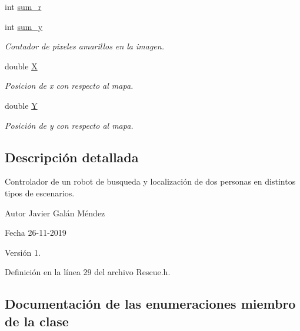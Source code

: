 \begin{DoxyCompactItemize}
int \hyperlink{classRescue_af84f4ef8ca1595be05ebcd5907f06c25_af84f4ef8ca1595be05ebcd5907f06c25}{sum\+\_\+r}
\item 
int \hyperlink{classRescue_a9a95f0cd95b72a89f87c6e9b19d71f73_a9a95f0cd95b72a89f87c6e9b19d71f73}{sum\+\_\+y}
\begin{DoxyCompactList}\small\item\em Contador de pixeles amarillos en la imagen. \end{DoxyCompactList}\item 
double \hyperlink{classRescue_ab2a4cd163b6619df49346383bb08d365_ab2a4cd163b6619df49346383bb08d365}{X}
\begin{DoxyCompactList}\small\item\em Posicion de x con respecto al mapa. \end{DoxyCompactList}\item 
double \hyperlink{classRescue_aefe62362f68d14dc3f9234791de23882_aefe62362f68d14dc3f9234791de23882}{Y}
\begin{DoxyCompactList}\small\item\em Posición de y con respecto al mapa. \end{DoxyCompactList}\end{DoxyCompactItemize}


\subsection{Descripción detallada}
Controlador de un robot de busqueda y localización de dos personas en distintos tipos de escenarios. 

\begin{DoxyAuthor}{Autor}
Javier Galán Méndez 
\end{DoxyAuthor}
\begin{DoxyDate}{Fecha}
26-\/11-\/2019 
\end{DoxyDate}
\begin{DoxyVersion}{Versión}
1. 
\end{DoxyVersion}


Definición en la línea 29 del archivo Rescue.\+h.



\subsection{Documentación de las enumeraciones miembro de la clase}
\mbox{\label{classRescue_ab44ced9ce57b1b0d19b5456cd952d702_ab44ced9ce57b1b0d19b5456cd952d702}} 

